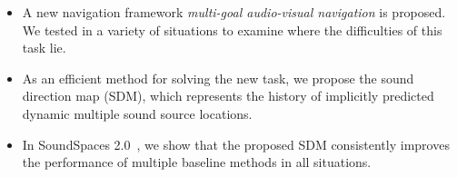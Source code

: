 \begin{itemize}[leftmargin=*]
\item A new navigation framework \textit{multi-goal audio-visual navigation} is proposed. We tested in a variety of situations to examine where the difficulties of this task lie.
\item As an efficient method for solving the new task, we propose the sound direction map (SDM), which represents the history of implicitly predicted dynamic multiple sound source locations.
\item In SoundSpaces 2.0~\cite{chen2022soundspaces}, we show that the proposed SDM consistently improves the performance of multiple baseline methods in all situations.
\end{itemize}